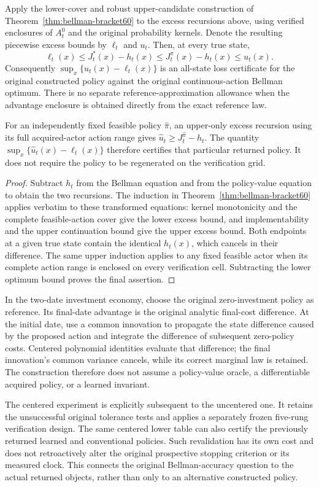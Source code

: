 \begin{corollary}\label{cor:centered60}
Apply the lower-cover and robust upper-candidate construction of Theorem~\ref{thm:bellman-bracket60} to the excess recursions above, using verified enclosures of $A_t^0$ and the original probability kernels. Denote the resulting piecewise excess bounds by $\ell_t$ and $u_t$. Then, at every true state,
\[
 \ell_t(x)\le J_t^*(x)-h_t(x)
       \le J_t^\pi(x)-h_t(x)\le u_t(x).
\]
Consequently $\sup_x\{u_t(x)-\ell_t(x)\}$ is an all-state loss certificate for the original constructed policy against the original continuous-action Bellman optimum. There is no separate reference-approximation allowance when the advantage enclosure is obtained directly from the exact reference law.

For an independently fixed feasible policy $\widehat\pi$, an upper-only excess recursion using its full acquired-actor action range gives $\widehat u_t\ge J_t^{\widehat\pi}-h_t$. The quantity $\sup_x\{\widehat u_t(x)-\ell_t(x)\}$ therefore certifies that particular returned policy. It does not require the policy to be regenerated on the verification grid.
\end{corollary}
\begin{proof}
Subtract $h_t$ from the Bellman equation and from the policy-value equation to obtain the two recursions. The induction in Theorem~\ref{thm:bellman-bracket60} applies verbatim to these transformed equations: kernel monotonicity and the complete feasible-action cover give the lower excess bound, and implementability and the upper continuation bound give the upper excess bound. Both endpoints at a given true state contain the identical $h_t(x)$, which cancels in their difference. The same upper induction applies to any fixed feasible actor when its complete action range is enclosed on every verification cell. Subtracting the lower optimum bound proves the final assertion.
\end{proof}

In the two-date investment economy, choose the original zero-investment policy as reference. Its final-date advantage is the original analytic final-cost difference. At the initial date, use a common innovation to propagate the state difference caused by the proposed action and integrate the difference of subsequent zero-policy costs. Centered polynomial identities evaluate that difference; the final innovation's common variance cancels, while its correct marginal law is retained. The construction therefore does not assume a policy-value oracle, a differentiable acquired policy, or a learned invariant.

The centered experiment is explicitly subsequent to the uncentered one. It retains the unsuccessful original tolerance tests and applies a separately frozen five-rung verification design. The same centered lower table can also certify the previously returned learned and conventional policies. Such revalidation has its own cost and does not retroactively alter the original prospective stopping criterion or its measured clock. This connects the original Bellman-accuracy question to the actual returned objects, rather than only to an alternative constructed policy.
